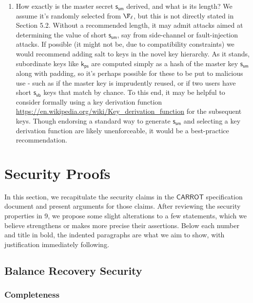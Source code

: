 \documentclass{article}
\theoremstyle{definition}
\newcommand{\6}{\mathbf}
\newcommand{\7}{\mathcal}
\newcommand{\sect}[1]{{\text{Section }#1}}
\renewcommand{\sf}[1]{{\mathsf{#1}}}
\newcommand{\carr}{$\sf{CARROT}$ }
\begin{document}
\begin{enumerate}
    
    \item How exactly is the master secret $\sf{s_{sm}}$ derived, and what is its length? We assume it's randomly selected from $\F_\ell$, but this is not directly stated in Section 5.2. Without a recommended length, it may admit attacks aimed at determining the value of short $\sf{s_{sm}}$, say from side-channel or fault-injection attacks. If possible (it might not be, due to compatibility constraints) we would recommend adding salt to keys in the novel key hierarchy. As it stands, subordinate keys like $\sf{k_{ps}}$ are computed simply as a hash of the master key $\sf{s_{sm}}$ along with padding, so it's perhaps possible for these to be put to malicious use - such as if the master key is imprudently reused, or if two users have short $\sf{s_{vb}}$ keys that match by chance. To this end, it may be helpful to consider formally using a key derivation function \url{https://en.wikipedia.org/wiki/Key_derivation_function} for the subsequent keys. Though endorsing a standard way to generate $\sf{s_{sm}}$ and selecting a key derivation function are likely unenforceable, it would be a best-practice recommendation.
    

\end{enumerate}






\section{Security Proofs}\label{sec:proofs}

In this section, we recapitulate the security claims in the \carr specification document and present arguments for those claims.
After reviewing the security properties in \sect{9}, we propose some slight alterations to a few statements, which we believe strengthens or makes more precise their assertions.
Below each number and title in bold, the indented paragraphs are what we aim to show, with justification immediately following. 



\subsection{Balance Recovery Security}


\subsubsection{Completeness} 
\end{document}
